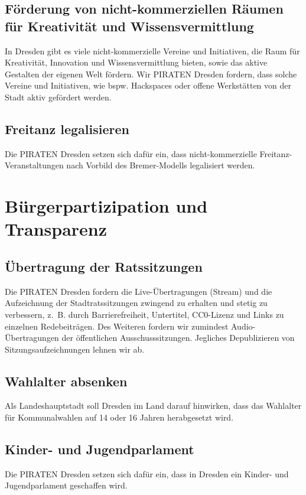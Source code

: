 \documentclass[a4paper, 11pt]{article}
\begin{document}
\subsection{Förderung von nicht-kommerziellen Räumen für Kreativität und Wissensvermittlung}
In Dresden gibt es viele nicht-kommerzielle Vereine und Initiativen, die Raum für Kreativität, Innovation und Wissensvermittlung bieten, sowie das aktive Gestalten der eigenen Welt fördern. Wir PIRATEN Dresden fordern, dass solche Vereine und Initiativen, wie bspw. Hackspaces oder offene Werkstätten von der Stadt aktiv gefördert werden.


\subsection{Freitanz legalisieren}
Die PIRATEN Dresden setzen sich dafür ein, dass nicht-kommerzielle Freitanz-Veranstaltungen nach Vorbild des Bremer-Modells legalisiert werden.



\section{Bürgerpartizipation und Transparenz}

\subsection{Übertragung der Ratssitzungen}
Die PIRATEN Dresden fordern die Live-Übertragungen (Stream) und die Aufzeichnung der Stadtratssitzungen zwingend zu erhalten und stetig zu verbessern, z. B. durch Barrierefreiheit, Untertitel, CC0-Lizenz und Links zu einzelnen Redebeiträgen. Des Weiteren fordern wir zumindest Audio-Übertragungen der öffentlichen Ausschusssitzungen. Jegliches Depublizieren von Sitzungsaufzeichnungen lehnen wir ab.




\subsection{Wahlalter absenken}
Als Landeshauptstadt soll Dresden im Land darauf hinwirken, dass das Wahlalter für Kommunalwahlen auf 14 oder 16 Jahren herabgesetzt wird.


\subsection{Kinder- und Jugendparlament}
Die PIRATEN Dresden setzen sich dafür ein, dass in Dresden ein Kinder- und Jugendparlament geschaffen wird.
\end{document}
